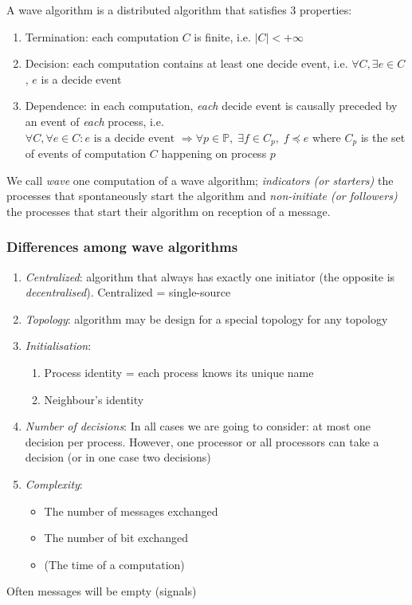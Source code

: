 \begin{defi}
A wave algorithm is a distributed algorithm that satisfies 3 properties:
\begin{enumerate}
\item Termination: each computation $C$ is finite, i.e. $|C|<+\infty$
\item Decision: each computation contains at least one decide event, i.e. $\forall C, \exists e \in C$, $e$ is a decide event
\item Dependence: in each computation, \emph{each} decide event is causally preceded by an event of \emph{each} process, i.e. $\forall C, \forall e\in C : \text{$e$ is a decide event } \Rightarrow \forall p \in \mathbb{P}, \; \exists f \in C_p,\; f\preceq e$ where $C_p$ is the set of events of computation $C$ happening on process $p$
\end{enumerate} 
\end{defi}

We call \emph{wave} one computation of a wave algorithm; \emph{indicators (or starters)} the processes that spontaneously start the algorithm and \emph{non-initiate (or followers)} the processes that start their algorithm on reception of a message.

\subsubsection*{Differences among wave algorithms}
\begin{enumerate}
\item \emph{Centralized}: algorithm that always has exactly one initiator (the opposite is \emph{decentralised}). Centralized = single-source
\item \emph{Topology}: algorithm may be design for a special topology for any topology
\item \emph{Initialisation}: 
\begin{enumerate}
\item Process identity = each process knows its unique name
\item Neighbour's identity
\end{enumerate}
\item \emph{Number of decisions}: In all cases we are going to consider: at most one decision per process. However, one processor or all processors can take a decision (or in one case two decisions)
\item \emph{Complexity}: 
\begin{itemize}
\item The number of messages exchanged
\item The number of bit exchanged
\item (The time of a computation)
\end{itemize}
\end{enumerate}
Often messages will be empty (signals)

